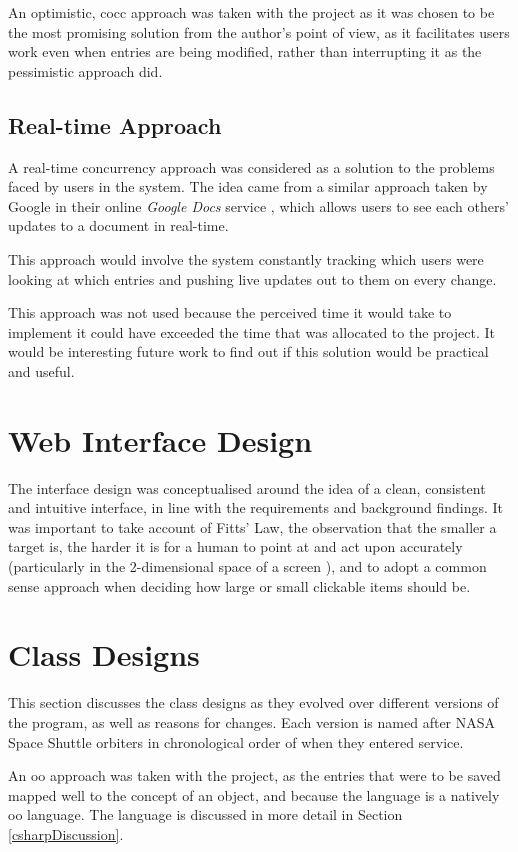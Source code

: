 An optimistic, \gls{cocc} approach was taken with the project as it was chosen to be the most promising solution from the author's point of view, as it facilitates users work even when entries are being modified, rather than interrupting it as the pessimistic approach did.

\subsection{Real-time Approach}
A real-time concurrency approach was considered as a solution to the problems faced by users in the system.  The idea came from a similar approach taken by Google in their online \textsl{Google Docs} service \cite{googleDocs}, which allows users to see each others' updates to a document in real-time. 

This approach would involve the system constantly tracking which users were looking at which entries and pushing live updates out to them on every change.

This approach was not used because the perceived time it would take to implement it could have exceeded the time that was allocated to the project.  It would be interesting future work to find out if this solution would be practical and useful.


\section{Web Interface Design}
\label{uiDesign}
The interface design was conceptualised around the idea of a clean, consistent and intuitive interface, in line with the requirements and background findings.  It was important to take account of Fitts' Law, the observation that the smaller a target is, the harder it is for a human to point at and act upon accurately \cite{fitts} (particularly in the 2-dimensional space of a screen \cite{fitts2d}), and to adopt a common sense approach when deciding how large or small clickable items should be.

\section{Class Designs}
This section discusses the class designs as they evolved over different versions of the program, as well as reasons for changes.  Each version is named after NASA Space Shuttle orbiters in chronological order of when they entered service.

An \gls{oo} approach was taken with the project, as the entries that were to be saved mapped well to the concept of an object, and because the \cs{} language is a natively \gls{oo} language.  The \cs{} language is discussed in more detail in Section \ref{csharpDiscussion}.

